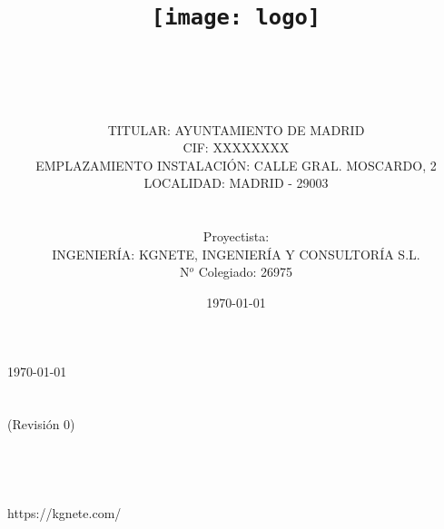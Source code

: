 \documentclass{report}
\title{\texttt{[image: logo]} \\ \proyectotitulo \\ \proyectosubtitulo }
\author{
\\
\vspace{2cm} \\
TITULAR: AYUNTAMIENTO DE MADRID \\
CIF: XXXXXXXX \\
EMPLAZAMIENTO INSTALACIÓN: CALLE GRAL. MOSCARDO, 2 \\
LOCALIDAD: MADRID - 29003  \\
\\
\vspace{2cm} \\
Proyectista: \proyectosubtitulo \\
INGENIERÍA: KGNETE, INGENIERÍA Y CONSULTORÍA S.L. \\
N$^o$ Colegiado: 26975
\vspace{2cm} \\
}
\date{\today}
\newcommand{\path}{../../../assets/settings}
\begin{document}
\maketitle
\tableofcontents







% 






\newpage



\vspace{15cm}
\hspace{8cm}
\begin{minipage}{11cm}
    {
        \today \\ 
        \proyectotitulo \\
        \proyectosubtitulo \\ 
        (Revisión 0) \\ \\
        \proyectistanombre \\ \\
    
     \\
    https://kgnete.com/
    }
\end{minipage}
\end{document}
